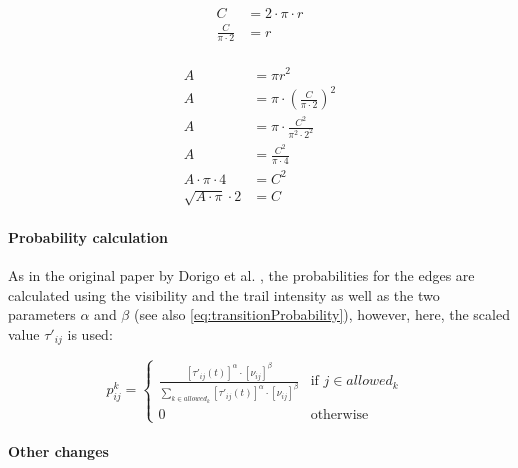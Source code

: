 \begin{minipage}[t][2.5cm][b]{0.4\textwidth}
	\begin{equation}
		\label{eq:scaleArea1}
		\begin{split}
			C &= 2 \cdot \pi \cdot r\\
			\frac{C}{\pi \cdot 2} &= r\\
		\end{split}
	\end{equation}
\end{minipage}
\begin{minipage}[t][2.5cm][b]{0.4\textwidth}
	\begin{equation}
		\label{eq:scaleArea2}
		\begin{split}
			A &= \pi r^2 \\
			A &= \pi \cdot \left(\frac{C}{\pi \cdot 2}\right)^2\\
			A &= \pi \cdot \frac{C^2}{\pi^2 \cdot 2^2}\\
			A &= \frac{C^2}{\pi \cdot 4}\\
			A \cdot \pi \cdot 4 &= C^2\\
			\sqrt{A \cdot \pi} \cdot 2 &= C
		\end{split}
	\end{equation}
\end{minipage}

\paragraph{Probability calculation}

As in the original paper by Dorigo et al. \cite{dorigo_ant_1996}, the probabilities for the edges are calculated using the visibility and the trail intensity as well as the two parameters $\alpha$ and $\beta$ (see also \ref{eq:transitionProbability}), however, here, the scaled value $\tau'_{ij}$ is used:

\begin{equation}\label{eq:transitionProbability2}
	p_{ij}^k = \begin{cases}
		\frac{[\tau'_{ij}(t)]^{\alpha} \cdot [\nu_{ij}]^{\beta}}{\sum_{k \in allowed_k} [\tau'_{ij}(t)]^{\alpha} \cdot [\nu_{ij}]^{\beta}} &\text{if $j \in allowed_k$ }\\
		0 &\text{otherwise}
	\end{cases}
\end{equation}

\paragraph{Other changes}

